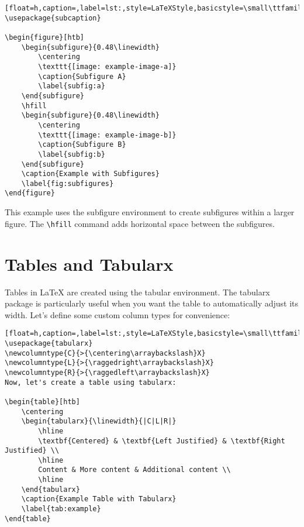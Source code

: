 \begin{lstlisting}[float=h,caption=,label=lst:,style=LaTeXStyle,basicstyle=\small\ttfamily,]
\usepackage{subcaption}

\begin{figure}[htb]
    \begin{subfigure}{0.48\linewidth}
        \centering
        \texttt{[image: example-image-a]}
        \caption{Subfigure A}
        \label{subfig:a}
    \end{subfigure}
    \hfill
    \begin{subfigure}{0.48\linewidth}
        \centering
        \texttt{[image: example-image-b]}
        \caption{Subfigure B}
        \label{subfig:b}
    \end{subfigure}
    \caption{Example with Subfigures}
    \label{fig:subfigures}
\end{figure}
\end{lstlisting}

This example uses the subfigure environment to create subfigures within a larger figure. The \lstinline|\hfill| command adds horizontal space between the subfigures.

\section{Tables and Tabularx}

Tables in LaTeX are created using the tabular environment. The tabularx package is particularly useful when you want the table to automatically adjust its width. Let's define some custom column types for convenience:

\begin{lstlisting}[float=h,caption=,label=lst:,style=LaTeXStyle,basicstyle=\small\ttfamily,]
\usepackage{tabularx}
\newcolumntype{C}{>{\centering\arraybackslash}X}
\newcolumntype{L}{>{\raggedright\arraybackslash}X}
\newcolumntype{R}{>{\raggedleft\arraybackslash}X}
Now, let's create a table using tabularx:

\begin{table}[htb]
    \centering
    \begin{tabularx}{\linewidth}{|C|L|R|}
        \hline
        \textbf{Centered} & \textbf{Left Justified} & \textbf{Right Justified} \\
        \hline
        Content & More content & Additional content \\
        \hline
    \end{tabularx}
    \caption{Example Table with Tabularx}
    \label{tab:example}
\end{table}
\end{lstlisting}

